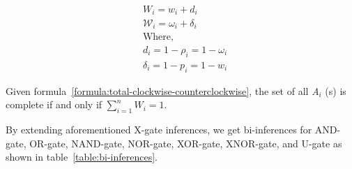 \documentclass{article}
\numberwithin{equation}{section}
\numberwithin{figure}{section}
\numberwithin{table}{section}
\begin{document}
\begin{equation}
\begin{split}
&W_i=w_i+d_i\\
&{\mathcal{W}}_i={\omega }_i+{\delta }_i\\
&\mathrm{Where,}\\
&d_i=1-{\rho }_i=1-{\omega }_i\\
&{\delta }_i=1-p_i=1-w_i
\end{split}
\label{formula:total-clockwise-counterclockwise}
\end{equation}

Given formula~\ref{formula:total-clockwise-counterclockwise}, the set of all \textit{A${}_{i}$} (s) is complete if and only if $\sum^n_{i=1}{W_i}=1$.

By extending aforementioned X-gate inferences, we get bi-inferences for AND-gate, OR-gate, NAND-gate, NOR-gate, XOR-gate, XNOR-gate, and U-gate as shown in table~\ref{table:bi-inferences}.
\end{document}
